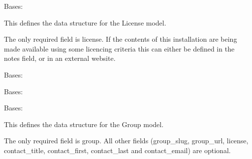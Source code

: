 \documentclass[letterpaper,10pt,english]{sphinxmanual}
\begin{document}
\begin{fulllineitems}
\label{api:groups.models.License}
Bases: 


This defines the data structure for the License model.


The only required field is license.
If the contents of this installation are being made available using some licencing criteria this can either be defined in the notes field, or in an external website.


\begin{fulllineitems}
\label{api:groups.models.License.DoesNotExist}
Bases: 


\end{fulllineitems}


\begin{fulllineitems}
\label{api:groups.models.License.MultipleObjectsReturned}
Bases: 


\end{fulllineitems}


\begin{fulllineitems}
\label{api:groups.models.License.group_set}
\end{fulllineitems}


\end{fulllineitems}


\begin{fulllineitems}
Bases: 


This defines the data structure for the Group model.


The only required field is group.
All other fields (group\_slug, group\_url, license, contact\_title, contact\_first, contact\_last and contact\_email) are optional.


\end{fulllineitems}
\end{document}
